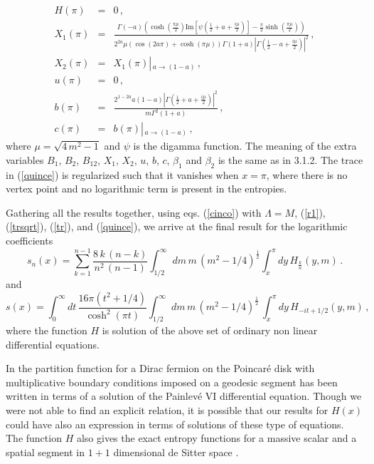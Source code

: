 \documentclass[11pt]{article}
\begin{document}
\begin{eqnarray}
H(\pi)&=&0\,,\\
X_1(\pi)&=&\frac{ \Gamma(-a) \left( \cosh \left( \frac{\pi \mu}{2} \right) \textrm{Im} \left[ \psi \left( \frac{1}{2} + a + \frac{i\mu}{2} \right) \right] - \frac{\pi}{2} \sinh \left( \frac{\pi\mu}{2} \right)   \right)}{2^{2a}\mu  \left( \cos \left( 2 a \pi\right)+\cosh (\pi \mu)\right) \Gamma (1+a) \left| \Gamma \left( \frac{1}{2}-a+\frac{i\mu}{2}\right) \right|^2 }\,,\label{xx1}\\
X_2(\pi)&=&X_1(\pi)\left|_{\,a\rightarrow (1-a)} \right. \,,\label{xx2} \\
u(\pi)&=&0\,, \label{upi}\\
b	(\pi)&=&\frac{ 2^{1-2a} a (1-a) \left| \Gamma\left( \frac{1}{2} +a+\frac{i\mu}{2}\right)\right|^2}{m\Gamma^2 (1+a)}\,,\label{treintaytres}\\
c(\pi)&=&b(\pi)\left|_{\,a\rightarrow (1-a)}\right.  \,,\label{treintaydos}
\end{eqnarray}
where $\mu=\sqrt{4\,m^2-1}$ and $\psi$ is the digamma function. The meaning of the extra variables $B_1$, $B_2$, $B_{12}$, $X_1$, $X_2$, $u$, $b$, $c$, $\beta_1$ and $\beta_2$ is the same as in 3.1.2. The trace in (\ref{quince}) is regularized such that it vanishes when $x=\pi$, where there is no vertex point and no logarithmic term is present in the entropies. 

Gathering all the results together, using eqs. (\ref{cinco}) with $\Lambda =M$, (\ref{r1}), (\ref{trsqrt}), (\ref{tr}), and (\ref{quince}), we arrive at the final result for the logarithmic coefficients 
\begin{equation}
s_n(x)= \sum_{k=1}^{n-1}\frac{8\,k\,(n-k)}{n^2\,(n-1)}\int_{1/2}^{\infty}dm\,m\,(m^2-1/4)^{\frac{1}{2}}\int_{x}^{\pi}dy \,H_\frac{k}{n}(y,m)\,.
\label{finalescalar}
\end{equation}
and 
\begin{equation}
s(x)=\int_0^\infty dt \, \frac{16\pi (t^2+1/4)}{\cosh^2(\pi t)} \int_{1/2}^{\infty}dm\,m\,\left(m^2-1/4\right)^{\frac{1}{2}}\,\int_{x}^{\pi}dy \,H_{-it+1/2}(y,m) \,,
\label{finalescalar1}
\end{equation}
where the function $H$ is solution of the above set of ordinary non linear differential equations. 



In  \cite{pain} the partition function for a Dirac fermion on the Poincar\'e disk with multiplicative boundary conditions imposed on a geodesic segment  has been written in terms of a solution of the Painlev\'e VI differential equation. Though we were not able to find an explicit relation, it is possible that our results for $H(x)$ could have also an expression in terms of solutions of these type of equations. 
The function $H$ also gives the exact entropy functions for a massive scalar and a spatial segment in $1+1$ dimensional de Sitter space \cite{log}. 
 
\end{document}
